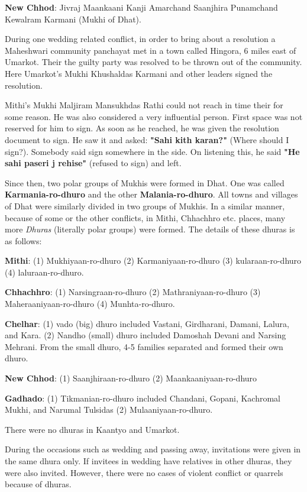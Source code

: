 \textbf{New Chhod}: Jivraj Maankaani
                    Kanji Amarchand Saanjhira
                    Punamchand Kewalram Karmani (Mukhi of Dhat).

During one wedding related conflict, in order to bring about a resolution a
Maheshwari community panchayat met in a town called Hingora, 6 miles east of
Umarkot. Their the guilty party was resolved to be thrown out of the community.
Here Umarkot's Mukhi Khushaldas Karmani and other leaders signed the
resolution.

Mithi's Mukhi Maljiram Mansukhdas Rathi could not reach in time their for some reason. He was also considered a very influential person. First space was not reserved for him to sign. As soon as he reached, he was given the resolution document to sign. He saw it and asked: \textbf{"Sahi kith karan?"} (Where should I sign?). Somebody said sign somewhere in the side. On listening this, he said \textbf{"He sahi paseri j rehise"} (refused to sign) and left.

Since then, two polar groups of Mukhis were formed in Dhat. One was called \textbf{Karmania-ro-dhuro} and the other \textbf{Malania-ro-dhuro}. All towns and villages of Dhat were similarly divided in two groups of Mukhis. In a similar manner, because of some or the other conflicts, in Mithi, Chhachhro etc. places, many more \textit{Dhuras} (literally polar groups) were formed. The details of these dhuras is as follows:

\textbf{Mithi}: (1) Mukhiyaan-ro-dhuro (2) Karmaniyaan-ro-dhuro (3) kularaan-ro-dhuro (4) laluraan-ro-dhuro.

\textbf{Chhachhro}: (1) Narsingraan-ro-dhuro (2) Mathraniyaan-ro-dhuro (3) Maheraaniyaan-ro-dhuro (4) Munhta-ro-dhuro.

\textbf{Chelhar}: (1) vado (big) dhuro included Vastani, Girdharani, Damani, Lalura, and Kara. (2) Nandho (small) dhuro included Damoshah Devani and Narsing Mehrani. From the small dhuro, 4-5 families separated and formed their own dhuro.

\textbf{New Chhod}: (1) Saanjhiraan-ro-dhuro (2) Maankaaniyaan-ro-dhuro

\textbf{Gadhado}: (1) Tikmanian-ro-dhuro included Chandani, Gopani, Kachromal Mukhi, and Narumal Tulsidas (2) Mulaaniyaan-ro-dhuro.

There were no dhuras in Kaantyo and Umarkot.

During the occasions such as wedding and passing away, invitations were given in the same dhura only. If invitees in wedding have relatives in other dhuras, they were also invited. However, there were no cases of violent conflict or quarrels because of dhuras.
